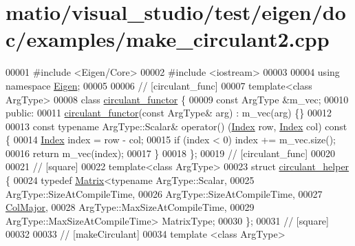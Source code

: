 \hypertarget{matio_2visual__studio_2test_2eigen_2doc_2examples_2make__circulant2_8cpp_source}{}\section{matio/visual\+\_\+studio/test/eigen/doc/examples/make\+\_\+circulant2.cpp}
\label{matio_2visual__studio_2test_2eigen_2doc_2examples_2make__circulant2_8cpp_source}

\begin{DoxyCode}
00001 \textcolor{preprocessor}{#include <Eigen/Core>}
00002 \textcolor{preprocessor}{#include <iostream>}
00003 
00004 \textcolor{keyword}{using namespace }\hyperlink{namespace_eigen}{Eigen};
00005 
00006 \textcolor{comment}{// [circulant\_func]}
00007 \textcolor{keyword}{template}<\textcolor{keyword}{class} ArgType>
00008 \textcolor{keyword}{class }\hyperlink{classcirculant__functor}{circulant\_functor} \{
00009   \textcolor{keyword}{const} ArgType &m\_vec;
00010 \textcolor{keyword}{public}:
00011   \hyperlink{classcirculant__functor}{circulant\_functor}(\textcolor{keyword}{const} ArgType& arg) : m\_vec(arg) \{\}
00012 
00013   \textcolor{keyword}{const} \textcolor{keyword}{typename} ArgType::Scalar& operator() (\hyperlink{namespace_eigen_a62e77e0933482dafde8fe197d9a2cfde}{Index} row, \hyperlink{namespace_eigen_a62e77e0933482dafde8fe197d9a2cfde}{Index} col)\textcolor{keyword}{ const }\{
00014     \hyperlink{namespace_eigen_a62e77e0933482dafde8fe197d9a2cfde}{Index} index = row - col;
00015     \textcolor{keywordflow}{if} (index < 0) index += m\_vec.size();
00016     \textcolor{keywordflow}{return} m\_vec(index);
00017   \}
00018 \};
00019 \textcolor{comment}{// [circulant\_func]}
00020 
00021 \textcolor{comment}{// [square]}
00022 \textcolor{keyword}{template}<\textcolor{keyword}{class} ArgType>
00023 \textcolor{keyword}{struct }\hyperlink{structcirculant__helper}{circulant\_helper} \{
00024   \textcolor{keyword}{typedef} \hyperlink{group___core___module_class_eigen_1_1_matrix}{Matrix}<\textcolor{keyword}{typename} ArgType::Scalar,
00025                  ArgType::SizeAtCompileTime,
00026                  ArgType::SizeAtCompileTime,
00027                  \hyperlink{group__enums_ggaacded1a18ae58b0f554751f6cdf9eb13a0cbd4bdd0abcfc0224c5fcb5e4f6669a}{ColMajor},
00028                  ArgType::MaxSizeAtCompileTime,
00029                  ArgType::MaxSizeAtCompileTime> MatrixType;
00030 \};
00031 \textcolor{comment}{// [square]}
00032 
00033 \textcolor{comment}{// [makeCirculant]}
00034 \textcolor{keyword}{template} <\textcolor{keyword}{class} ArgType>

\end{DoxyCode}
